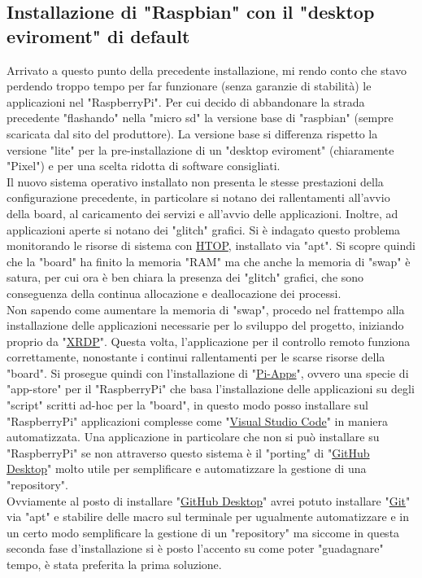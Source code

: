 \subsection{Installazione di "Raspbian" con il "desktop eviroment" di default}
Arrivato a questo punto della precedente installazione, mi rendo conto che stavo perdendo troppo tempo per far funzionare (senza garanzie di stabilità) le applicazioni nel "RaspberryPi". Per cui decido di abbandonare la strada precedente "flashando" nella "micro sd" la versione base di "raspbian" (sempre scaricata dal sito del produttore). La versione base si differenza rispetto la versione "lite" per la pre-installazione di un "desktop eviroment" (chiaramente "Pixel") e per una scelta ridotta di software consigliati.\\
Il nuovo sistema operativo installato non presenta le stesse prestazioni della configurazione precedente, in particolare si notano dei rallentamenti all'avvio della board, al caricamento dei servizi e all'avvio delle applicazioni. Inoltre, ad applicazioni aperte si notano dei "glitch" grafici. Si è indagato questo problema monitorando le risorse di sistema con \href{https://htop.dev/}{HTOP}, installato via "apt". Si scopre quindi che la "board" ha finito la memoria "RAM" ma che anche la memoria di "swap" è satura, per cui ora è ben chiara la presenza dei "glitch" grafici, che sono conseguenza della continua allocazione e deallocazione dei processi.\\
Non sapendo come aumentare la memoria di "swap", procedo nel frattempo alla installazione delle applicazioni necessarie per lo sviluppo del progetto, iniziando proprio da "\href{https://github.com/neutrinolabs/xrdp}{XRDP}". Questa volta, l'applicazione per il controllo remoto funziona correttamente, nonostante i continui rallentamenti per le scarse risorse della "board". Si prosegue quindi con l'installazione di "\href{https://pi-apps.io/}{Pi-Apps}", ovvero una specie di "app-store" per il "RaspberryPi" che basa l'installazione delle applicazioni su degli "script" scritti ad-hoc per la "board", in questo modo posso installare sul "RaspberryPi" applicazioni complesse come "\href{https://code.visualstudio.com/}{Visual Studio Code}" in maniera automatizzata. Una applicazione in particolare che non si può installare su "RaspberryPi" se non attraverso questo sistema è il "porting" di "\href{https://desktop.github.com/}{GitHub Desktop}" molto utile per semplificare e automatizzare la gestione di una "repository".\\
Ovviamente al posto di installare "\href{https://desktop.github.com/}{GitHub Desktop}" avrei potuto installare "\href{https://git-scm.com/}{Git}" via "apt" e stabilire delle macro sul terminale per ugualmente automatizzare e in un certo modo semplificare la gestione di un "repository" ma siccome in questa seconda fase d'installazione si è posto l'accento su come poter "guadagnare" tempo, è stata preferita la prima soluzione.\\
